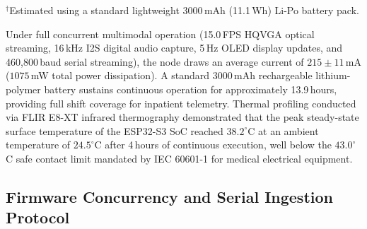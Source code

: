 \documentclass[journal]{IEEEtran}
\begin{document}
\begin{table}[!t]
    \centering
    \caption{Measured current consumption and power dissipation of the SonicVitals edge sensing node across operational states ($V_{\mathrm{in}} = 5.0$\,V).}
    \label{tab:power_consumption}
    \footnotesize
    \renewcommand{\arraystretch}{1.10}
    \setlength{\tabcolsep}{3.0pt}
    \vspace{1ex}
    \raggedright
    \scriptsize $^{\dagger}$Estimated using a standard lightweight 3000\,mAh (11.1\,Wh) Li-Po battery pack.
\end{table}

Under full concurrent multimodal operation (15.0\,FPS HQVGA optical streaming, 16\,kHz I2S digital audio capture, 5\,Hz OLED display updates, and 460,800\,baud serial streaming), the node draws an average current of $215 \pm 11$\,mA ($1075$\,mW total power dissipation). A standard 3000\,mAh rechargeable lithium-polymer battery sustains continuous operation for approximately 13.9\,hours, providing full shift coverage for inpatient telemetry. Thermal profiling conducted via FLIR E8-XT infrared thermography demonstrated that the peak steady-state surface temperature of the ESP32-S3 SoC reached $38.2^\circ$C at an ambient temperature of $24.5^\circ$C after 4\,hours of continuous execution, well below the $43.0^\circ$C safe contact limit mandated by IEC 60601-1 for medical electrical equipment.

\subsection{Firmware Concurrency and Serial Ingestion Protocol}
\end{document}
